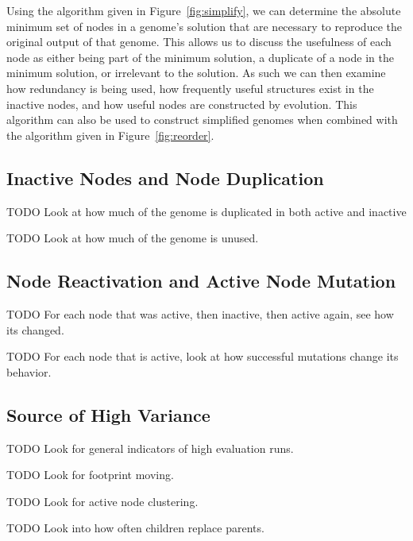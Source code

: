 \documentclass[journal]{IEEEtran}
\begin{document}
Using the algorithm given in Figure~\ref{fig:simplify}, we can determine the
absolute minimum set of nodes in a genome's solution that are necessary to
reproduce the original output of that genome.  This allows us to discuss
the usefulness of each node as either being part of the minimum solution, a
duplicate of a node in the minimum solution, or irrelevant to the solution.
As such we can then examine how redundancy is being used, how frequently useful
structures exist in the inactive nodes, and how useful nodes are constructed by evolution.
This algorithm can also be used to construct simplified genomes when combined
with the algorithm given in Figure~\ref{fig:reorder}.

\subsection{Inactive Nodes and Node Duplication}
TODO Look at how much of the genome is duplicated in both active and inactive

TODO Look at how much of the genome is unused.

\subsection{Node Reactivation and Active Node Mutation}
TODO For each node that was active, then inactive, then active again, see how its changed.

TODO For each node that is active, look at how successful mutations change its behavior.

\subsection{Source of High Variance}
TODO Look for general indicators of high evaluation runs.

TODO Look for footprint moving.

TODO Look for active node clustering.

TODO Look into how often children replace parents.


%
%
\end{document}
